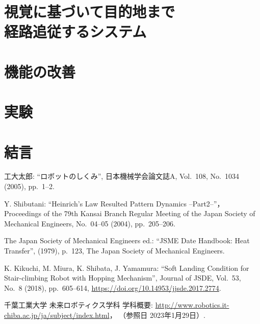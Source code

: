 \documentclass[10pt]{jarticle}
\begin{document}
    \section{視覚に基づいて目的地まで\\経路追従するシステム}
    \section{機能の改善}%

    
    \section{実験}%
        
    \section{結\hspace{2zw}言}%
    
    \vspace{5truemm}
    {\footnotesize
        \begin{thebibliography}{99}
            
            工大太郎: ``ロボットのしくみ'', 
            日本機械学会論文誌A, 
            Vol.~108, No.~1034 (2005), pp.~1--2.
            
            Y. Shibutani: ``Heinrich's Law Resulted Pattern Dynamics --Part2--''，
            Proceedings of the 79th Kansai Branch Regular Meeting of the Japan Society of Mechanical Engineers,  
            No.~04--05 (2004), pp.~205--206.
            
            The Japan Society of Mechanical Engineers ed.: ``JSME Date Handbook: Heat Transfer'', 
            (1979), p.~123, The Japan Society of Mechanical Engineers.
            
            K. Kikuchi, M. Miura, K. Shibata, J. Yamamura: ``Soft Landing Condition for Stair-climbing Robot with Hopping Mechanism'', 
            Journal of JSDE, Vol.~53, No.~8 (2018), pp.~605--614, \url{https://doi.org/10.14953/jjsde.2017.2774}.
            
            千葉工業大学 未来ロボティクス学科 学科概要: 
            \url{http://www.robotics.it-chiba.ac.jp/ja/subject/index.html}， 
            （参照日 2023年1月29日）. 
            
        \end{thebibliography}
    }
    \normalsize
    
\end{document}
